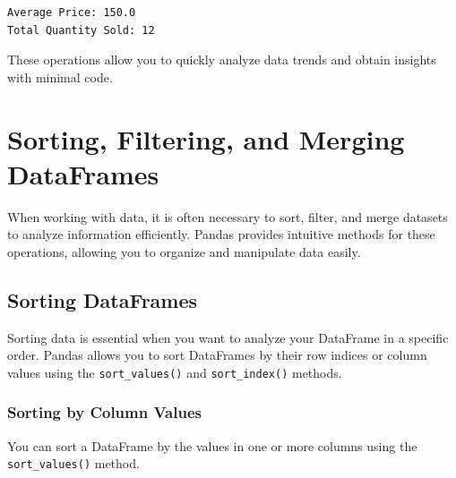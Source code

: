 \documentclass[
  letterpaper,
  DIV=11,
  numbers=noendperiod]{scrreprt}
\begin{document}
\begin{verbatim}
Average Price: 150.0
Total Quantity Sold: 12
\end{verbatim}

These operations allow you to quickly analyze data trends and obtain
insights with minimal code.

\hypertarget{sorting-filtering-and-merging-dataframes}{%
\section{Sorting, Filtering, and Merging
DataFrames}\label{sorting-filtering-and-merging-dataframes}}

When working with data, it is often necessary to sort, filter, and merge
datasets to analyze information efficiently. Pandas provides intuitive
methods for these operations, allowing you to organize and manipulate
data easily.

\hypertarget{sorting-dataframes}{%
\subsection{Sorting DataFrames}\label{sorting-dataframes}}

Sorting data is essential when you want to analyze your DataFrame in a
specific order. Pandas allows you to sort DataFrames by their row
indices or column values using the \texttt{sort\_values()} and
\texttt{sort\_index()} methods.

\hypertarget{sorting-by-column-values}{%
\subsubsection{Sorting by Column
Values}\label{sorting-by-column-values}}

You can sort a DataFrame by the values in one or more columns using the
\texttt{sort\_values()} method.
\end{document}
